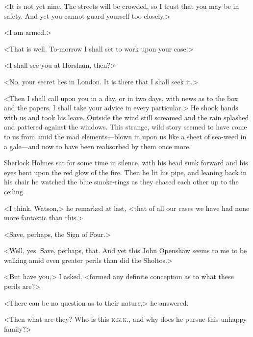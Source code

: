 <It is not yet nine. The streets will be crowded, so I trust that you may be in safety. And yet you cannot guard yourself too closely.>

<I am armed.>

<That is well. To-morrow I shall set to work upon your case.>

<I shall see you at Horsham, then?>

<No, your secret lies in London. It is there that I shall seek it.>

<Then I shall call upon you in a day, or in two days, with news as to the box and the papers. I shall take your advice in every particular.> He shook hands with us and took his leave. Outside the wind still screamed and the rain splashed and pattered against the windows. This strange, wild story seemed to have come to us from amid the mad elements—blown in upon us like a sheet of sea-weed in a gale—and now to have been reabsorbed by them once more.

Sherlock Holmes sat for some time in silence, with his head sunk forward and his eyes bent upon the red glow of the fire. Then he lit his pipe, and leaning back in his chair he watched the blue smoke-rings as they chased each other up to the ceiling.

<I think, Watson,> he remarked at last, <that of all our cases we have had none more fantastic than this.>

<Save, perhaps, the Sign of Four.>

<Well, yes. Save, perhaps, that. And yet this John Openshaw seems to me to be walking amid even greater perils than did the Sholtos.>

<But have you,> I asked, <formed any definite conception as to what these perils are?>

<There can be no question as to their nature,> he answered.

<Then what are they? Who is this \textsc{k.k.k.}, and why does he pursue this unhappy family?>


